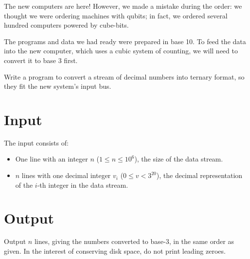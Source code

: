 
%
The new computers are here! However, we made a mistake during the order: we
thought we were ordering machines with qubits; in fact, we ordered several
hundred computers powered by cube-bits.

The programs and data we had ready were prepared in base 10. To feed the data
into the new computer, which uses a cubic system of counting, we will need to
convert it to base 3 first.

Write a program to convert a stream of decimal numbers into ternary format, so
they fit the new system's input bus.

\section*{Input}
The input consists of:
\begin{itemize}
	\item One line with an integer $n$ ($1 \le n \le 10^6$), the size of the data stream.
    \item $n$ lines with one decimal integer $v_i$ ($0 \le v < 3^{20}$), the decimal
representation of the $i$-th integer in the data stream.
\end{itemize}
\section*{Output}

Output $n$ lines, giving the numbers converted to base-$3$, in the same order as given.
In the interest of conserving disk space, do not print leading zeroes.
